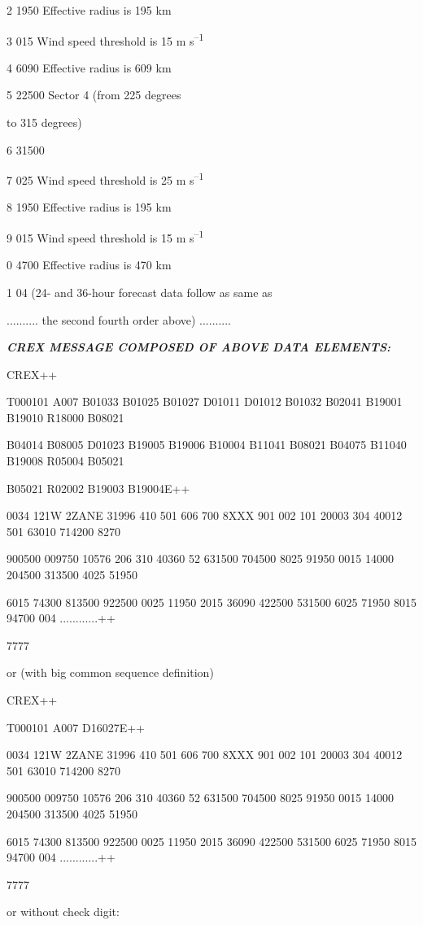 2 1950 Effective radius is 195 km

3 015 Wind speed threshold is 15 m s\textsuperscript{--1}

4 6090 Effective radius is 609 km

5 22500 Sector 4 (from 225 degrees

to 315 degrees)

6 31500

7 025 Wind speed threshold is 25 m s\textsuperscript{--1}

8 1950 Effective radius is 195 km

9 015 Wind speed threshold is 15 m s\textsuperscript{--1}

0 4700 Effective radius is 470 km

1 04 (24- and 36-hour forecast data follow as same as

.......... the second fourth order above) ..........

\emph{\textbf{CREX MESSAGE COMPOSED OF ABOVE DATA ELEMENTS:}}

CREX++

T000101 A007 B01033 B01025 B01027 D01011 D01012 B01032 B02041 B19001 B19010 R18000 B08021

B04014 B08005 D01023 B19005 B19006 B10004 B11041 B08021 B04075 B11040 B19008 R05004 B05021

B05021 R02002 B19003 B19004E++

0034 121W 2ZANE 31996 410 501 606 700 8XXX 901 002 101 20003 304 40012 501 63010 714200 8270

900500 009750 10576 206 310 40360 52 631500 704500 8025 91950 0015 14000 204500 313500 4025 51950

6015 74300 813500 922500 0025 11950 2015 36090 422500 531500 6025 71950 8015 94700 004 ............++

7777

or (with big common sequence definition)

CREX++

T000101 A007 D16027E++

0034 121W 2ZANE 31996 410 501 606 700 8XXX 901 002 101 20003 304 40012 501 63010 714200 8270

900500 009750 10576 206 310 40360 52 631500 704500 8025 91950 0015 14000 204500 313500 4025 51950

6015 74300 813500 922500 0025 11950 2015 36090 422500 531500 6025 71950 8015 94700 004 ............++

7777

or without check digit:

